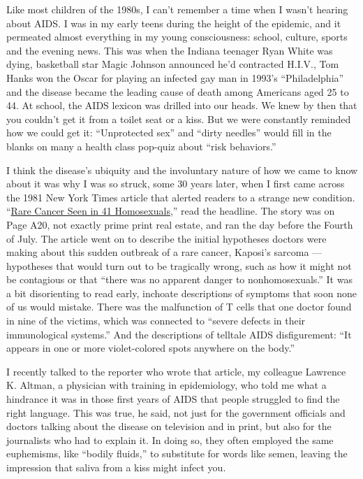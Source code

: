 Like most children of the 1980s, I can't remember a time when I wasn't
hearing about AIDS. I was in my early teens during the height of the
epidemic, and it permeated almost everything in my young consciousness:
school, culture, sports and the evening news. This was when the Indiana
teenager Ryan White was dying, basketball star Magic Johnson announced
he'd contracted H.I.V., Tom Hanks won the Oscar for playing an infected
gay man in 1993's ``Philadelphia'' and the disease became the leading
cause of death among Americans aged 25 to 44. At school, the AIDS
lexicon was drilled into our heads. We knew by then that you couldn't
get it from a toilet seat or a kiss. But we were constantly reminded how
we could get it: ``Unprotected sex'' and ``dirty needles'' would fill in
the blanks on many a health class pop-quiz about ``risk behaviors.''

I think the disease's ubiquity and the involuntary nature of how we came
to know about it was why I was so struck, some 30 years later, when I
first came across the 1981 New York Times article that alerted readers
to a strange new condition.
``\href{https://www.nytimes3xbfgragh.onion/1981/07/03/us/rare-cancer-seen-in-41-homosexuals.html}{Rare
Cancer Seen in 41 Homosexuals},'' read the headline. The story was on
Page A20, not exactly prime print real estate, and ran the day before
the Fourth of July. The article went on to describe the initial
hypotheses doctors were making about this sudden outbreak of a rare
cancer, Kaposi's sarcoma --- hypotheses that would turn out to be
tragically wrong, such as how it might not be contagious or that ``there
was no apparent danger to nonhomosexuals.'' It was a bit disorienting to
read early, inchoate descriptions of symptoms that soon none of us would
mistake. There was the malfunction of T cells that one doctor found in
nine of the victims, which was connected to ``severe defects in their
immunological systems.'' And the descriptions of telltale AIDS
disfigurement: ``It appears in one or more violet-colored spots anywhere
on the body.''

I recently talked to the reporter who wrote that article, my colleague
Lawrence K. Altman, a physician with training in epidemiology, who told
me what a hindrance it was in those first years of AIDS that people
struggled to find the right language. This was true, he said, not just
for the government officials and doctors talking about the disease on
television and in print, but also for the journalists who had to explain
it. In doing so, they often employed the same euphemisms, like ``bodily
fluids,'' to substitute for words like semen, leaving the impression
that saliva from a kiss might infect you.

